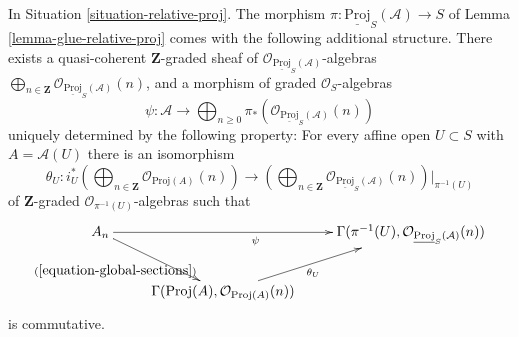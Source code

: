 \begin{lemma}
\label{lemma-glue-relative-proj-twists}
In Situation \ref{situation-relative-proj}.
The morphism $\pi : \underline{\text{Proj}}_S(\mathcal{A}) \to S$
of Lemma \ref{lemma-glue-relative-proj} comes with the following
additional structure.
There exists a quasi-coherent $\mathbf{Z}$-graded sheaf
of $\mathcal{O}_{\underline{\text{Proj}}_S(\mathcal{A})}$-algebras
$\bigoplus\nolimits_{n \in \mathbf{Z}}
\mathcal{O}_{\underline{\text{Proj}}_S(\mathcal{A})}(n)$,
and a morphism of graded $\mathcal{O}_S$-algebras
$$
\psi :
\mathcal{A}
\longrightarrow
\bigoplus\nolimits_{n \geq 0}
\pi_*\left(\mathcal{O}_{\underline{\text{Proj}}_S(\mathcal{A})}(n)\right)
$$
uniquely determined by the following property:
For every affine open $U \subset S$ with $A = \mathcal{A}(U)$ 
there is an isomorphism
$$
\theta_U :
i_U^*\left(
\bigoplus\nolimits_{n \in \mathbf{Z}} \mathcal{O}_{\text{Proj}(A)}(n)
\right)
\longrightarrow
\left(
\bigoplus\nolimits_{n \in \mathbf{Z}}
\mathcal{O}_{\underline{\text{Proj}}_S(\mathcal{A})}(n)
\right)|_{\pi^{-1}(U)}
$$
of $\mathbf{Z}$-graded $\mathcal{O}_{\pi^{-1}(U)}$-algebras
such that
$$
\xymatrix{
A_n
\ar[rr]_\psi
\ar[dr]_-{(\ref{equation-global-sections})}
& &
\Gamma(\pi^{-1}(U),
\mathcal{O}_{\underline{\text{Proj}}_S(\mathcal{A})}(n)) \\
&
\Gamma(\text{Proj}(A),
\mathcal{O}_{\text{Proj}(A)}(n))
\ar[ru]_-{\theta_U}
&
}
$$
is commutative.
\end{lemma}

